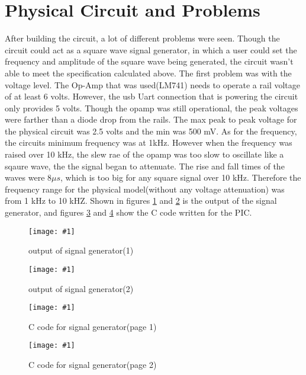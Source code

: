 \documentclass[12pt]{article}
\newcommand{\myfig}[2] {
    \label{page:#1}
    \begin{figure}[ht]
        \begin{framed}
        \centering
          \texttt{[image: \#1]}\\
          \caption{#2}\label{fig:#1}
        \end{framed}
    \end{figure}
}
\begin{document}
\section{Physical Circuit and Problems}
	After building the circuit, a lot of different problems were seen. Though the circuit could act as a square wave signal generator, in which a user could set the frequency and amplitude of the square wave being generated, the circuit wasn't able to meet the specification calculated above. The first problem was with the voltage level. The Op-Amp that was used(LM741) needs to operate a rail voltage of at least 6 volts. However, the usb Uart connection that is powering the circuit only provides 5 volts. Though the opamp was still operational, the peak voltages were farther than a diode drop from the rails. The max peak to peak voltage for the physical circuit was 2.5 volts and the min was 500 mV. As for the frequency, the circuits minimum frequency was at 1kHz. However when the frequency was raised over 10 kHz, the slew rae of the opamp was too slow to oscillate like a sqaure wave, the the signal began to attenuate. The rise and fall times of the waves were $8 \mu s$, which is too big for any square signal over 10 kHz. Therefore the frequency range for the physical model(without any voltage attenuation) was from 1 kHz to 10 kHZ. Shown in figures \ref{fig:output} and \ref{fig:output2} is the output of the signal generator, and figures \ref{fig:code1} and \ref{fig:code2} show the C code written for the PIC. \myfig{output}{output of signal generator(1)}\myfig{output2}{output of signal generator(2)}\myfig{code1}{C code for signal generator(page 1)}\myfig{code2}{C code for signal generator(page 2)}
\end{document}
